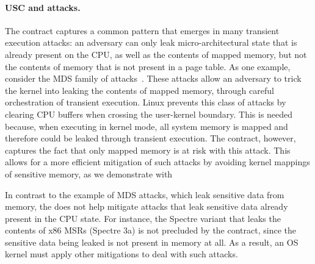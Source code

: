 
\paragraph{USC and attacks.}

The contract captures a common pattern that emerges in many transient
execution attacks: an adversary can only leak micro-architectural
state that is already present on the CPU, as well as the contents
of mapped memory, but not the contents of memory that is not
present in a page table.  As one example, consider the MDS family
of attacks~\cite{canella:fallout, schwarz:zombieload,schaik:ridl}.
These attacks allow an adversary to trick the kernel into leaking the
contents of mapped memory, through careful orchestration of transient
execution.  Linux prevents this class of attacks by clearing CPU buffers
when crossing the user-kernel boundary.  This is needed because, when
executing in kernel mode, all system memory is mapped and therefore
could be leaked through transient execution.  The contract, however,
captures the fact that only mapped memory is at risk with this attack.
This allows for a more efficient mitigation of such attacks by avoiding kernel mappings of sensitive memory, as we demonstrate with \sys

In contrast to the example of MDS attacks, which leak sensitive data
from memory, the \contract{} does not help mitigate attacks that leak
sensitive data already present in the CPU state.  For instance, the
Spectre variant that leaks the contents of x86 MSRs (Spectre 3a) is not
precluded by the contract, since the sensitive data being leaked is not
present in memory at all.  As a result, an OS kernel must apply other
mitigations to deal with such attacks.

